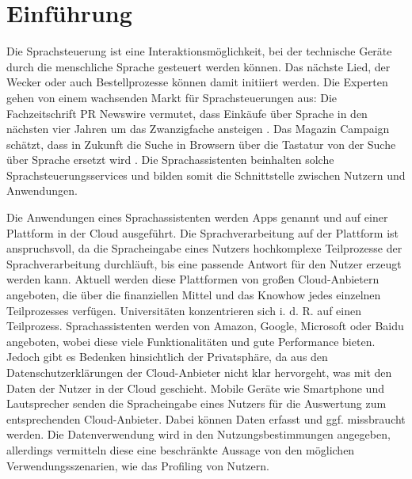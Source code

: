 \section{Einführung}
Die Sprachsteuerung ist eine Interaktionsmöglichkeit, bei der technische Geräte durch die menschliche Sprache gesteuert werden können. Das nächste Lied, der Wecker oder auch Bestellprozesse können damit initiiert werden.  Die Experten gehen von einem wachsenden Markt für Sprachsteuerungen aus: Die Fachzeitschrift \glqq PR Newswire\grqq{} vermutet, dass Einkäufe über Sprache in den nächsten vier Jahren um das Zwanzigfache ansteigen \cite{prNewswire}. Das Magazin \glqq Campaign\grqq{} schätzt, dass in Zukunft die Suche in Browsern über die Tastatur von der Suche über Sprache ersetzt wird \cite{Campaign}. Die Sprachassistenten beinhalten solche Sprachsteuerungsservices und bilden somit die Schnittstelle zwischen Nutzern und Anwendungen. 

Die Anwendungen eines Sprachassistenten werden Apps genannt und auf einer Plattform in der Cloud ausgeführt. Die Sprachverarbeitung auf der Plattform ist anspruchsvoll, da die Spracheingabe eines Nutzers hochkomplexe Teilprozesse der Sprachverarbeitung durchläuft, bis eine passende Antwort für den Nutzer erzeugt werden kann. Aktuell werden diese Plattformen von großen Cloud-Anbietern angeboten, die über die finanziellen Mittel und das Knowhow jedes einzelnen Teilprozesses verfügen. Universitäten konzentrieren sich i. d. R. auf einen Teilprozess. Sprachassistenten werden von Amazon, Google, Microsoft oder Baidu angeboten, wobei diese viele Funktionalitäten und gute Performance bieten. Jedoch gibt es Bedenken hinsichtlich der Privatsphäre, da aus den Datenschutzerklärungen der Cloud-Anbieter nicht klar hervorgeht, was mit den Daten der Nutzer in der Cloud geschieht. Mobile Geräte wie Smartphone und Lautsprecher senden die Spracheingabe eines Nutzers für die Auswertung zum entsprechenden Cloud-Anbieter. Dabei können Daten erfasst und ggf. missbraucht werden. Die Datenverwendung wird in den Nutzungsbestimmungen angegeben, allerdings vermitteln diese eine beschränkte Aussage von den möglichen Verwendungsszenarien, wie das Profiling von Nutzern. 


